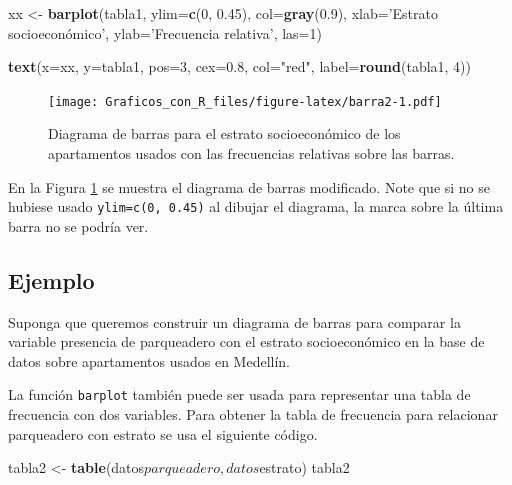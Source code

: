 \documentclass[10pt,]{krantz}
\makeatletter
\newenvironment{Shaded}{\begin{snugshade}}{\end{snugshade}}
\newcommand{\KeywordTok}[1]{\textcolor[rgb]{0.13,0.29,0.53}{\textbf{{#1}}}}
\newcommand{\DataTypeTok}[1]{\textcolor[rgb]{0.13,0.29,0.53}{{#1}}}
\newcommand{\DecValTok}[1]{\textcolor[rgb]{0.00,0.00,0.81}{{#1}}}
\newcommand{\FloatTok}[1]{\textcolor[rgb]{0.00,0.00,0.81}{{#1}}}
\newcommand{\StringTok}[1]{\textcolor[rgb]{0.31,0.60,0.02}{{#1}}}
\newcommand{\NormalTok}[1]{{#1}}
\newenvironment{kframe}{%
\medskip{}
\setlength{\fboxsep}{.8em}
 \def\at@end@of@kframe{}%
 \ifinner\ifhmode%
  \def\at@end@of@kframe{\end{minipage}}%
  \begin{minipage}{\columnwidth}%
 \fi\fi%
 \def\FrameCommand##1{\hskip\@totalleftmargin \hskip-\fboxsep
 \colorbox{shadecolor}{##1}\hskip-\fboxsep
     \hskip-\linewidth \hskip-\@totalleftmargin \hskip\columnwidth}%
 \MakeFramed {\advance\hsize-\width
   \@totalleftmargin\z@ \linewidth\hsize
   \@setminipage}}%
 {\par\unskip\endMakeFramed%
 \at@end@of@kframe}
\renewenvironment{Shaded}{\begin{kframe}}{\end{kframe}}
\makeatother
\begin{document}
\begin{Shaded}
\begin{Highlighting}[]
\NormalTok{xx <-}\StringTok{ }\KeywordTok{barplot}\NormalTok{(tabla1, }\DataTypeTok{ylim=}\KeywordTok{c}\NormalTok{(}\DecValTok{0}\NormalTok{, }\FloatTok{0.45}\NormalTok{), }\DataTypeTok{col=}\KeywordTok{gray}\NormalTok{(}\FloatTok{0.9}\NormalTok{),}
              \DataTypeTok{xlab=}\StringTok{'Estrato socioeconómico'}\NormalTok{,}
              \DataTypeTok{ylab=}\StringTok{'Frecuencia relativa'}\NormalTok{, }\DataTypeTok{las=}\DecValTok{1}\NormalTok{)}

\KeywordTok{text}\NormalTok{(}\DataTypeTok{x=}\NormalTok{xx, }\DataTypeTok{y=}\NormalTok{tabla1, }\DataTypeTok{pos=}\DecValTok{3}\NormalTok{, }\DataTypeTok{cex=}\FloatTok{0.8}\NormalTok{, }\DataTypeTok{col=}\StringTok{"red"}\NormalTok{,}
     \DataTypeTok{label=}\KeywordTok{round}\NormalTok{(tabla1, }\DecValTok{4}\NormalTok{))}
\end{Highlighting}
\end{Shaded}

\begin{figure}[htbp]
\centering
\texttt{[image: Graficos\_con\_R\_files/figure-latex/barra2-1.pdf]}
\caption{\label{fig:barra2}Diagrama de barras para el estrato socioeconómico
de los apartamentos usados con las frecuencias relativas sobre las
barras.}
\end{figure}

En la Figura \ref{fig:barra2} se muestra el diagrama de barras
modificado. Note que si no se hubiese usado \texttt{ylim=c(0,\ 0.45)} al
dibujar el diagrama, la marca sobre la última barra no se podría ver.

\subsection*{Ejemplo}\label{ejemplo-18}


Suponga que queremos construir un diagrama de barras para comparar la
variable presencia de parqueadero con el estrato socioeconómico en la
base de datos sobre apartamentos usados en Medellín.

La función \texttt{barplot} también puede ser usada para representar una
tabla de frecuencia con dos variables. Para obtener la tabla de
frecuencia para relacionar parqueadero con estrato se usa el siguiente
código.

\begin{Shaded}
\begin{Highlighting}[]
\NormalTok{tabla2 <-}\StringTok{ }\KeywordTok{table}\NormalTok{(datos$parqueadero, datos$estrato)}
\NormalTok{tabla2}
\end{Highlighting}
\end{Shaded}
\end{document}
